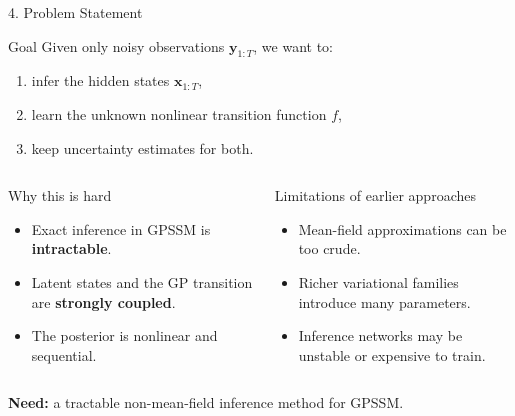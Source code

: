 \documentclass[aspectratio=169,11pt]{beamer}
\begin{document}
\begin{frame}{4. Problem Statement}
\begin{block}{Goal}
Given only noisy observations $\mathbf{y}_{1:T}$, we want to:
\begin{enumerate}
  \item infer the hidden states $\mathbf{x}_{1:T}$,
  \item learn the unknown nonlinear transition function $f$,
  \item keep uncertainty estimates for both.
\end{enumerate}
\end{block}

\vspace{1mm}
\begin{columns}[T,totalwidth=\textwidth]
\begin{block}{Why this is hard}
\begin{itemize}
  \item Exact inference in GPSSM is \textbf{intractable}.
  \item Latent states and the GP transition are \textbf{strongly coupled}.
  \item The posterior is nonlinear and sequential.
\end{itemize}
\end{block}

\begin{block}{Limitations of earlier approaches}
\begin{itemize}
  \item Mean-field approximations can be too crude.
  \item Richer variational families introduce many parameters.
  \item Inference networks may be unstable or expensive to train.
\end{itemize}
\end{block}
\end{columns}

\vspace{1mm}
\begin{center}
\Large \textbf{Need:} a tractable non-mean-field inference method for GPSSM.
\end{center}
\end{frame}
\end{document}
